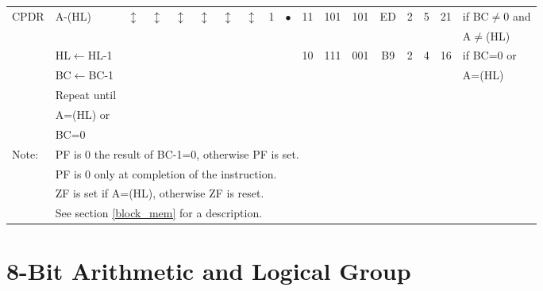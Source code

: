 \documentclass[oneside,a4paper]{book}
\begin{document}
{\begin{tabular}{llc@{ }c@{ }c@{ }c@{ }c@{ }c@{ }c@{ }cc@{ }c@{ }cccccll}
CPDR & A-(HL) &
	$\updownarrow$\footnotemark[4] & $\updownarrow$\footnotemark[3] & $\updownarrow$\footnotemark[4] & $\updownarrow$\footnotemark[4] 
	& $\updownarrow$\footnotemark[4] & $\updownarrow$\footnotemark[1] & 1 & $\bullet$ & 11 & 101 & 101
	& ED & 2 & 5 & 21 & \multicolumn{2}{l}{if BC$\not=$0 and}  \\ 
 \multicolumn{17}{c}{} & \multicolumn{2}{l}{A$\not=$(HL)}  \\
	& HL$\leftarrow$HL-1 & \multicolumn{8}{c}{} & 10 & 111 & 001 & B9 & 2 & 4 & 16 & \multicolumn{2}{l}{if BC=0 or} \\
	& BC$\leftarrow$BC-1 & \multicolumn{15}{c}{} & \multicolumn{2}{l}{A=(HL)} \\ 
	& Repeat until& \multicolumn{15}{c}{} & & \\ 
	& A=(HL) or & \multicolumn{15}{c}{} & & \\ 
	& BC=0 & \multicolumn{15}{c}{} & & \\  \hline

Note: & \multicolumn{18}{l}{\parbox{12cm}{\footnotemark[1]PF is 0 the result of BC-1=0, otherwise PF is set.}} \\
      & \multicolumn{18}{l}{\parbox{12cm}{\footnotemark[2]PF is 0 only at completion of the instruction.}} \\
      & \multicolumn{18}{l}{\parbox{12cm}{\footnotemark[3]ZF is set if A=(HL), otherwise ZF is reset.}} \\
      & \multicolumn{18}{l}{\parbox{12cm}{\footnotemark[4]See section \ref{block_mem} for a description.}} \\ \hline
\end{tabular}
}

\section{8-Bit Arithmetic and Logical Group}

\setlength{\textwidth}{18cm}
\end{document}
